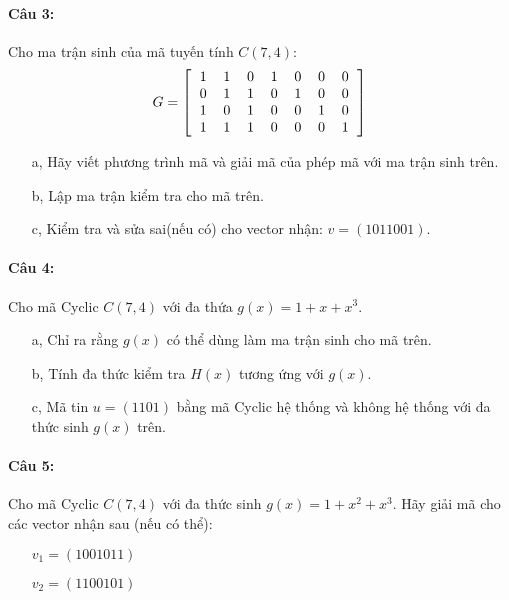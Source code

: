 \documentclass[paper=a4, fontsize=11pt]{scrartcl}
\numberwithin{equation}{section}		%
\numberwithin{figure}{section}			%
\numberwithin{table}{section}				%
\begin{document}
 	\paragraph{Câu 3:} Cho ma trận sinh của mã tuyến tính $C(7,4)$: \\
 	$$ G = \left[ 
 	\begin{tabular}{ccccccc}
 	1 & 1 & 0 & 1 & 0 & 0 & 0 \\ 
 	0 & 1 & 1 & 0 & 1 & 0 & 0 \\ 
 	1 & 0 & 1 & 0 & 0 & 1 & 0 \\ 
 	1 & 1 & 1 & 0 & 0 & 0 & 1 \\ 
 	\end{tabular} \right]  
 	$$	
 	\begin{itemize}
 		\item[a,] Hãy viết phương trình mã và giải mã của phép mã với ma trận sinh trên.
 		\item[b,] Lập ma trận kiểm tra cho mã trên. 
 		\item[c,] Kiểm tra và sửa sai(nếu có) cho vector nhận: $v= (1011001)$.
 	\end{itemize}
 	\paragraph{Câu 4:} Cho mã Cyclic $C(7,4)$ với đa thứa $g(x)= 1+ x + x^3$.
 	\begin{itemize}
 		\item[a,] Chỉ ra rằng $g(x)$ có thể dùng làm ma trận sinh cho mã trên.
 		\item[b,] Tính đa thức kiểm tra $H(x)$ tương ứng với $g(x)$. 
 		\item[c,] Mã tin $u= (1101)$ bằng mã Cyclic hệ thống và không hệ thống với đa thức sinh $g(x)$ trên.
 	\end{itemize}
 	
 	\paragraph{Câu 5:} Cho mã Cyclic $C(7,4)$ với đa thức sinh $g(x)= 1+ x^2 + x^3$. Hãy giải mã cho các vector nhận sau (nếu có thể):
 	
 	\begin{itemize}
 		\item[] $v_1= (1001011)$
 		\item[] $v_2= (1100101)$
 	\end{itemize}
\end{document}
